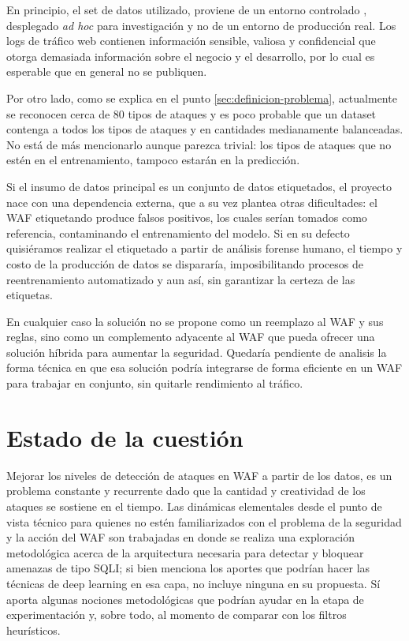 \documentclass[12pt]{article}
\begin{document}
En principio, el set de datos utilizado, proviene de un entorno controlado \cite{riera2022capec}, desplegado \textit{ad hoc} para investigación y no de un entorno de producción real. Los logs de tráfico web contienen información sensible, valiosa y confidencial que otorga demasiada información sobre el negocio y el desarrollo, por lo cual es esperable que en general no se publiquen.

Por otro lado, como se explica en el punto \ref{sec:definicion-problema}, actualmente se reconocen cerca de 80 tipos de ataques y es poco probable que un dataset contenga a todos los tipos de ataques y en cantidades medianamente balanceadas. No está de más mencionarlo aunque parezca trivial: los tipos de ataques que no estén en el entrenamiento, tampoco estarán en la predicción. 

Si el insumo de datos principal es un conjunto de datos etiquetados, el proyecto nace con una dependencia externa, que a su vez plantea otras dificultades: el WAF etiquetando produce falsos positivos, los cuales serían tomados como referencia, contaminando el entrenamiento del modelo. Si en su defecto quisiéramos realizar el etiquetado a partir de análisis forense humano, el tiempo y costo de la producción de datos se dispararía, imposibilitando procesos de reentrenamiento automatizado y aun así, sin garantizar la certeza de las etiquetas.


En cualquier caso la solución no se propone como un reemplazo al WAF y sus reglas, sino como un complemento adyacente al WAF que pueda ofrecer una solución híbrida para aumentar la seguridad. Quedaría pendiente de analisis la forma técnica en que esa solución podría integrarse de forma eficiente en un WAF para trabajar en conjunto, sin quitarle rendimiento al tráfico. 

\section{Estado de la cuestión}
Mejorar los niveles de detección de ataques en WAF a partir de los datos, es un problema constante y recurrente dado que la cantidad y creatividad de los ataques se sostiene en el tiempo. Las dinámicas elementales desde el punto de vista técnico para quienes no estén familiarizados con el problema de la seguridad y la acción del WAF son trabajadas en \cite{hassan2026improving} donde se realiza una exploración metodológica acerca de la arquitectura necesaria para detectar y bloquear amenazas de tipo SQLI; si bien menciona los aportes que podrían hacer las técnicas de deep learning en esa capa, no incluye ninguna en su propuesta. Sí aporta algunas nociones metodológicas que podrían ayudar en la etapa de experimentación y, sobre todo, al momento de comparar con los filtros heurísticos.
\end{document}
